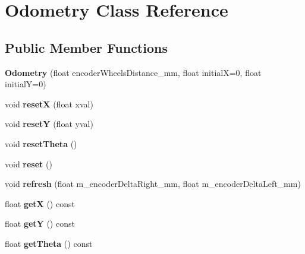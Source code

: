 \hypertarget{classOdometry}{}\section{Odometry Class Reference}
\label{classOdometry}
\subsection*{Public Member Functions}
\begin{DoxyCompactItemize}
\item 
\mbox{\label{classOdometry_a291fde86afe947cb8cdf6b1fb9afac03}} 
{\bfseries Odometry} (float encoder\+Wheels\+Distance\+\_\+mm, float initialX=0, float initialY=0)
\item 
\mbox{\label{classOdometry_a7cf956955caba44b0a5f02ddc8ba5999}} 
void {\bfseries resetX} (float xval)
\item 
\mbox{\label{classOdometry_a349d2ec049e26cee47aa2ff93dd80bb8}} 
void {\bfseries resetY} (float yval)
\item 
\mbox{\label{classOdometry_ab9e21a4d0199017a5291fdbf4b7b0cad}} 
void {\bfseries reset\+Theta} ()
\item 
\mbox{\label{classOdometry_a699bbc51fa495b061d9a24a0c9bf39b6}} 
void {\bfseries reset} ()
\item 
\mbox{\label{classOdometry_a2fb8230ebf512e607d47536543654a69}} 
void {\bfseries refresh} (float m\+\_\+encoder\+Delta\+Right\+\_\+mm, float m\+\_\+encoder\+Delta\+Left\+\_\+mm)
\item 
\mbox{\label{classOdometry_a514ebd5fd467d0c1ea3b16c1340523b9}} 
float {\bfseries getX} () const
\item 
\mbox{\label{classOdometry_a22a93be6c1a9fb0d1d0df6d797b45eee}} 
float {\bfseries getY} () const
\item 
\mbox{\label{classOdometry_ac80de3b7140772ffd9b3f20f74e90421}} 
float {\bfseries get\+Theta} () const
\item 
\mbox{\label{classOdometry_ac8249dafe5098cfb637221acb068cba9}} 

\end{DoxyCompactItemize}

